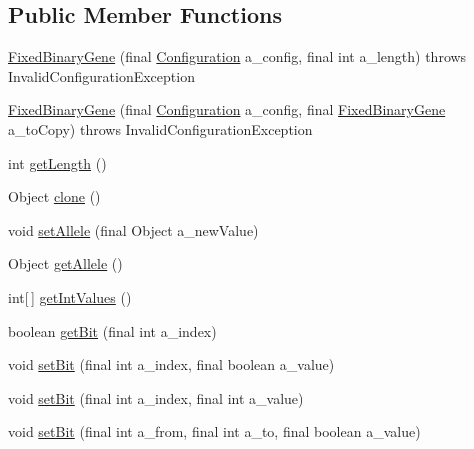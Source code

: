 \subsection*{Public Member Functions}
\begin{DoxyCompactItemize}
\item 
\hyperlink{classorg_1_1jgap_1_1impl_1_1_fixed_binary_gene_ada1b64f43007aa838440e58689147818}{Fixed\-Binary\-Gene} (final \hyperlink{classorg_1_1jgap_1_1_configuration}{Configuration} a\-\_\-config, final int a\-\_\-length)  throws Invalid\-Configuration\-Exception 
\item 
\hyperlink{classorg_1_1jgap_1_1impl_1_1_fixed_binary_gene_a563a12cceac65a4f5b1d03152630aec3}{Fixed\-Binary\-Gene} (final \hyperlink{classorg_1_1jgap_1_1_configuration}{Configuration} a\-\_\-config, final \hyperlink{classorg_1_1jgap_1_1impl_1_1_fixed_binary_gene}{Fixed\-Binary\-Gene} a\-\_\-to\-Copy)  throws Invalid\-Configuration\-Exception 
\item 
int \hyperlink{classorg_1_1jgap_1_1impl_1_1_fixed_binary_gene_aa67e18910e728f47403f74f063f33cf8}{get\-Length} ()
\item 
Object \hyperlink{classorg_1_1jgap_1_1impl_1_1_fixed_binary_gene_a7763fec4b36cd24c4a75850c66258387}{clone} ()
\item 
void \hyperlink{classorg_1_1jgap_1_1impl_1_1_fixed_binary_gene_ae253eaecdab77e190ec9deb4c01bafb7}{set\-Allele} (final Object a\-\_\-new\-Value)
\item 
Object \hyperlink{classorg_1_1jgap_1_1impl_1_1_fixed_binary_gene_a538336e75c89f2df35bc7301f187e9a7}{get\-Allele} ()
\item 
int\mbox{[}$\,$\mbox{]} \hyperlink{classorg_1_1jgap_1_1impl_1_1_fixed_binary_gene_ae852ca3daeb30e73092a857e4139ab0c}{get\-Int\-Values} ()
\item 
boolean \hyperlink{classorg_1_1jgap_1_1impl_1_1_fixed_binary_gene_a3f193522e6c09322a2302af6ba843be9}{get\-Bit} (final int a\-\_\-index)
\item 
void \hyperlink{classorg_1_1jgap_1_1impl_1_1_fixed_binary_gene_a52df0ecfc1ebc56cc7d2acf55bed6a16}{set\-Bit} (final int a\-\_\-index, final boolean a\-\_\-value)
\item 
void \hyperlink{classorg_1_1jgap_1_1impl_1_1_fixed_binary_gene_a581d875e5a56d9a36a71c05cc7a5505c}{set\-Bit} (final int a\-\_\-index, final int a\-\_\-value)
\item 
void \hyperlink{classorg_1_1jgap_1_1impl_1_1_fixed_binary_gene_aeb4c759a52ad0fbdb1a8861cb66e479b}{set\-Bit} (final int a\-\_\-from, final int a\-\_\-to, final boolean a\-\_\-value)

\end{DoxyCompactItemize}
